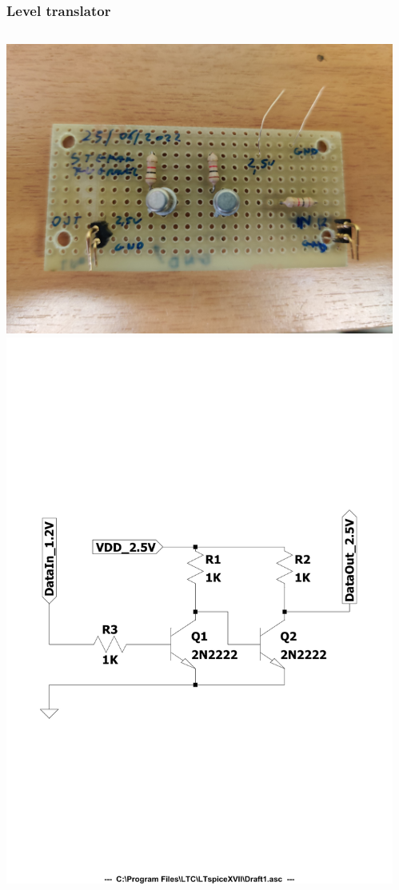 \documentclass[aspectratio=169]{beamer}
\begin{document}
	\begin{frame}
	\frametitle{Level translator}
	\begin{columns}
		\begin{center}
			\includegraphics[width=0.8 \textwidth]{IMG/level_translator_front-min.jpg}
			\includegraphics[width=0.8 \textwidth]{IMG/Diagram_cropped.pdf}
		\end{center}
		\begin{center}

\end{center}
\end{columns}
\end{frame}
\end{document}
